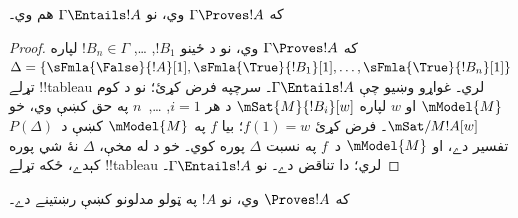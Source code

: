 \documentclass[../../../include/open-logic-section]{subfiles}
\begin{document}
\begin{cor}
که $\Gamma \Proves !A$ وي، نو $\Gamma \Entails !A$ هم وي۔
\end{cor}

\begin{proof}
  که $\Gamma \Proves !A$ وي، نو د ځينو $!B_1$, \dots,
  $!B_n \in \Gamma$ لپاره
  $\Delta = \{\sFmla{\False}{!A}[1], \sFmla{\True}{!B_1}[1],
  \dots, \sFmla{\True}{!B_n}[1]\}$ تړلے !!{tableau} لري۔
  غواړو وښيو چې $\Gamma \Entails !A$۔ سرچپه فرض کړئ؛ نو د
  کوم $\mModel{M}$ او $w$ لپاره $\mSat{M}{!B_i}[w]$ د هر
  $i=1$, \dots,~$n$ په حق کښې وي، خو
  $\mSat/{M}{!A}[w]$۔ فرض کړئ $f(1) = w$؛ بيا $f$ په
  $\mModel{M}$ کښې د~$P(\Delta)$ تفسير دے، او $\mModel{M}$
  د~$f$ په نسبت $\Delta$ پوره کوي۔ خو د
   له مخې، $\Delta$ نۀ شي پوره
  کېدے، ځکه تړلے !!{tableau} لري؛ دا تناقض دے۔ نو
  $\Gamma \Entails !A$۔
\end{proof}

\begin{cor}
که $\Proves !A$ وي، نو $!A$ په ټولو مدلونو کښې رښتينے دے۔
\end{cor}
\end{document}
